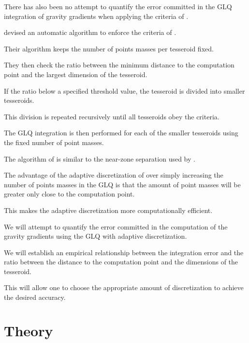 \documentclass[paper,twocolumn]{geophysics}
\begin{document}
There has also been no attempt to quantify the error committed in the GLQ
integration of gravity gradients when applying the criteria of \citet{Ku1977}.

\citet{Li2011} devised an automatic algorithm to enforce the criteria of
\citet{Ku1977}.

Their algorithm keeps the number of points masses per tesseroid fixed.

They then check the ratio between the minimum distance to the computation point
and the largest dimension of the tesseroid.

If the ratio below a specified threshold value, the tesseroid is divided into
smaller tesseroids.

This division is repeated recursively until all tesseroids obey the criteria.

The GLQ integration is then performed for each of the smaller tesseroids
using the fixed number of point masses.

The algorithm of \citet{Li2011} is similar to the near-zone separation used by
\citet{Grombein2013}.

The advantage of the adaptive discretization of \citet{Li2011} over simply
increasing the number of points masses in the GLQ is that the
amount of point masses will be greater only close to the computation point.

This makes the adaptive discretization more computationally efficient.


We will attempt to quantify the error committed in the computation of the
gravity gradients using the GLQ with adaptive discretization.

We will establish an empirical relationship between the integration error and
the ratio between the distance to the computation point and the dimensions of
the tesseroid.

This will allow one to choose the appropriate amount of discretization to
achieve the desired accuracy.


\section{Theory}
\end{document}
